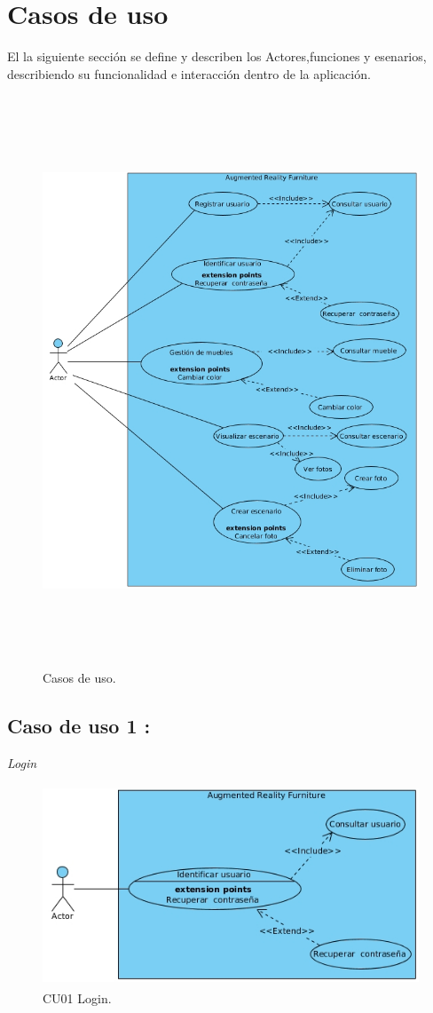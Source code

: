 
\newpage
\section{Casos de uso}
El la siguiente sección se define y describen los Actores,funciones y esenarios, describiendo su funcionalidad e interacción dentro de la aplicación.\par
\vspace{5mm}
\begin{figure}[h!]
	\centering
	\includegraphics[width=15cm,height=17cm]{imagenes/analisis/casosDeUso.jpg}
	\caption{Casos de uso.}
	\label{fig:analogo}
\end{figure}  
\newpage

\subsection{Caso de uso 1 :} \textit{Login}
\begin{figure}[h!]
	\centering
	\includegraphics[width=12cm,height=6cm]{imagenes/analisis/login.jpg}
	\caption{CU01 Login.}
	\label{fig:analogo}
\end{figure}  

